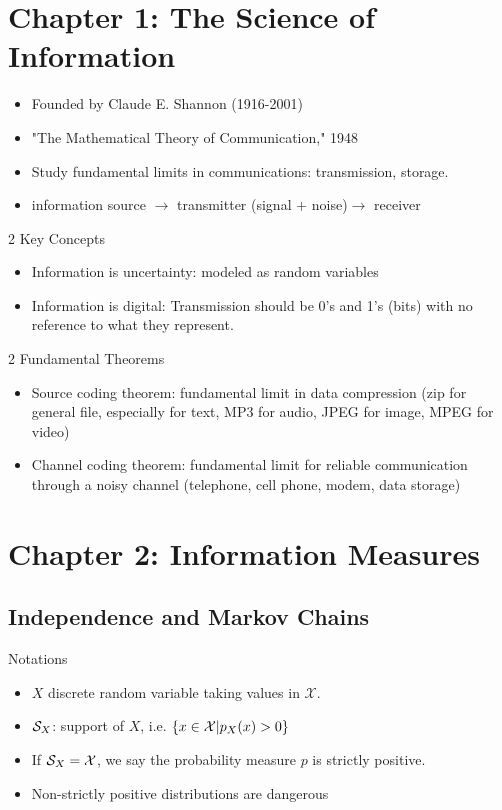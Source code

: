 \documentclass[../main.tex]{subfiles}
\begin{document}
    
\chapter{Chapter 1: The Science of Information}
\begin{itemize}
    \item Founded by Claude E. Shannon (1916-2001)
    \item "The Mathematical Theory of Communication," 1948
    \item Study fundamental limits in communications: transmission, storage.
    \item information source $\to$ transmitter (signal + noise)$\to$ receiver
\end{itemize}
\begin{pbox}{2 Key Concepts}
    \begin{itemize}
        \item Information is uncertainty: modeled as random variables
        \item Information is digital: Transmission should be 0's and 1's (bits) with no reference to what they represent.
    \end{itemize}
\end{pbox}
\begin{bbox}{2 Fundamental Theorems}
    \begin{itemize}
        \item Source coding theorem: fundamental limit in data compression (zip for general file, especially for text, MP3 for audio, JPEG for image, MPEG for video)
        \item Channel coding theorem: fundamental limit for reliable communication through a noisy channel (telephone, cell phone, modem, data storage)
    \end{itemize}
\end{bbox}


\chapter{Chapter 2: Information Measures}
\section{Independence and Markov Chains}
\begin{pbox}{Notations}
    \begin{itemize}
        \item $X$ discrete random variable taking values in $\mathcal{X}$.
        \item $\S_X$: support of $X$, i.e. $\{x\in\X|p_X(x)>0\}$
        \item If $\mathcal{S}_X = \X$, we say the probability measure $p$ is strictly positive.
        \item Non-strictly positive distributions are dangerous
    \end{itemize}
\end{pbox}
\end{document}
